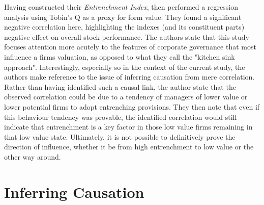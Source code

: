 {{Having constructed their {\it Entrenchment Index}, \cite{bebchukWhatMatters} then performed a regression analysis using Tobin's Q as a proxy for form value. They found a significant negative correlation here, highlighting the indexes (and its constituent parts) negative effect on overall stock performance. The authors state that this study focuses attention more acutely to the features of corporate governance that most influence a firms valuation, as opposed to what they call the "kitchen sink approach". Interestingly, especially so in the context of the current study, the authors make reference to the issue of inferring causation from mere correlation. Rather than having identified such a causal link, the author state that the observed correlation could be due to a tendency of managers of lower value or lower potential firms to adopt entrenching provisions. They then note that even if this behaviour tendency was provable, the identified correlation would still indicate that entrenchment is a key factor in those low value firms remaining in that low value state. Ultimately, it is not possible to definitively prove the direction of influence, whether it be from high entrenchment to low value or the other way around. }
\section{Inferring Causation}
}
